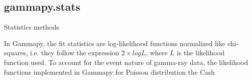 \subsection{gammapy.stats}
\label{ssec:gammapy-stats}
Statistics methods

In Gammapy, the fit statistics are log-likelihood functions normalized like chi-squares,
i.e. they follow the expression $2 \times log L$, where $L$ is the likelihood function used.
To account for the event nature of gamma-ray data, the likelihood functions implemented
in Gammapy for Poisson distribution the Cash